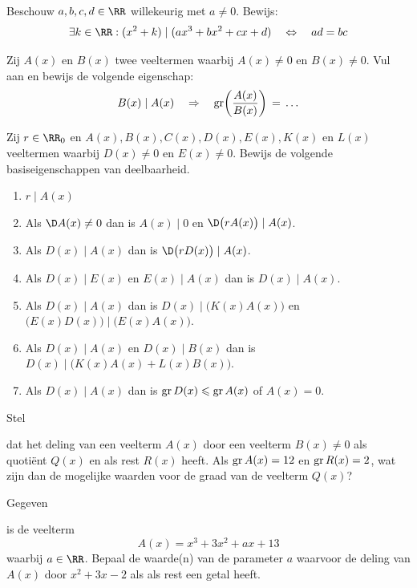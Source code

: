 \documentclass{ximera}
\begin{document}
\begin{Oefening}
Beschouw $a,b,c,d \in \RR$ willekeurig met $a \neq 0$. Bewijs:
\[
\exists k \in \RR: (x^2 + k) \mid (ax^3 + bx^2 + cx + d) \quad \Leftrightarrow \quad ad = bc
\]
\end{Oefening}

\begin{Uitbreiding}
\begin{Oefening} 
Zij $A(x)$ en $B(x)$ twee veeltermen waarbij $A(x) \neq 0$ en $B(x) \neq 0$. Vul aan en bewijs de volgende eigenschap:
\[
B(x) \mid A(x) \quad \Rightarrow \quad \operatorname{gr}\biggl(\frac{A(x)}{B(x)}\biggr) 
\, = \, \ldots
\]
\end{Oefening}

\begin{Oefening}
Zij $r \in \RR_0$ en $A(x), B(x), C(x), D(x), E(x), K(x)$ en $L(x)$ veeltermen waarbij $D(x) \neq 0$ en $E(x) \neq 0$. Bewijs de volgende basiseigenschappen van deelbaarheid. 
\begin{enumerate}
\item
$r \mid A(x)$
\item
Als $\D A(x)  \neq 0$ dan is $A(x) \mid 0$ en $\D \bigl(rA(x)\bigr) \mid A(x)$.
\item
Als $D(x) \mid A(x)$ dan is $\D \bigl(rD(x)\bigr) \mid A(x)$.
\item
Als $D(x) \mid E(x)$ en $E(x) \mid A(x)$ dan is $D(x) \mid A(x)$. 
\item
Als $D(x) \mid A(x)$ dan is $D(x) \mid \bigl(K(x)A(x)\bigr)$ en $\bigl(E(x)D(x)\bigr) \mid \bigl(E(x)A(x)\bigr)$.
\item
Als $D(x) \mid A(x)$ en $D(x) \mid B(x)$ dan is $D(x) \mid \bigl(K(x)A(x)+L(x)B(x)\bigr)$.
\item
Als $D(x) \mid A(x)$ dan is $\operatorname{gr} D(x) \leqslant \operatorname{gr} A(x)$ of $A(x) = 0$.
\end{enumerate}
\end{Oefening}
\end{Uitbreiding}

\begin{Oefening}\setcounter{enumi}{17}  
\hypertarget{oef2.17}{Stel} dat het deling van een veelterm $A(x)$ door een veelterm $B(x) \neq 0$ als quoti\"ent $Q(x)$ en als rest $R(x)$ heeft. Als $\operatorname{gr} A(x) = 12$ en $\operatorname{gr} R(x) = 2$, wat zijn dan de mogelijke waarden voor de graad van de veelterm $Q(x)$?
\end{Oefening}

\begin{Oefening}\setcounter{enumi}{18} 
\hypertarget{oef2.18}{Gegeven} is de veelterm
\[
A(x) = x^3+3x^2+ax+13
\]
waarbij $a \in \RR$. Bepaal de waarde(n) van de parameter $a$ waarvoor de deling van $A(x)$ door $x^2+3x-2$ als als rest een getal heeft. 
\end{Oefening}
\end{document}
